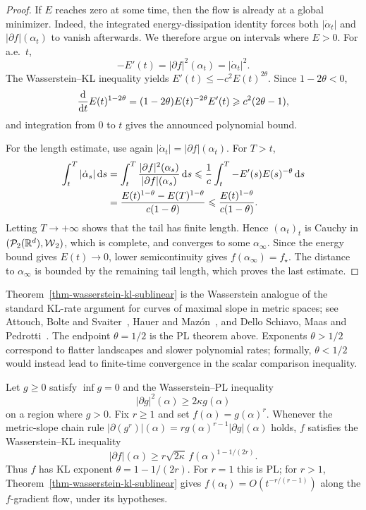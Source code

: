\begin{proof}
	If \(E\) reaches zero at some time, then the flow is already at a global minimizer. Indeed, the integrated energy-dissipation identity forces both \(|\dot\alpha_t|\) and \(|\partial f|(\alpha_t)\) to vanish afterwards. We therefore argue on intervals where \(E>0\). For a.e.\ \(t\),
	\[
		-E'(t)=|\partial f|^2(\alpha_t)=|\dot\alpha_t|^2.
	\]
	The Wasserstein--KL inequality yields
	\(E'(t) \leq -c^2E(t)^{2\theta}\).
	Since \(1-2\theta<0\),
	\[
		\frac{\mathrm{d}}{\mathrm{d} t}E(t)^{1-2\theta}
		=
		(1-2\theta)E(t)^{-2\theta}E'(t)
		\geqslant
		c^2(2\theta-1),
	\]
	and integration from \(0\) to \(t\) gives the announced polynomial bound.

	For the length estimate, use again \(|\dot\alpha_t|=|\partial f|(\alpha_t)\). For \(T>t\),
	\[
		\begin{aligned}
		\int_t^T |\dot\alpha_s|\,\mathrm{d} s
		&=
		\int_t^T \frac{|\partial f|^2(\alpha_s)}{|\partial f|(\alpha_s)}\,\mathrm{d} s
		\leqslant
		\frac1c\int_t^T -E'(s)E(s)^{-\theta}\,\mathrm{d} s \\
		&=
		\frac{E(t)^{1-\theta}-E(T)^{1-\theta}}{c(1-\theta)}
		\leqslant
		\frac{E(t)^{1-\theta}}{c(1-\theta)}.
		\end{aligned}
	\]
	Letting \(T\to+\infty\) shows that the tail has finite length. Hence \((\alpha_t)_t\) is Cauchy in \((\mathcal{P}_2(\mathbb{R}^d),\operatorname{\mathcal{W}}_2)\), which is complete, and converges to some \(\alpha_\infty\). Since the energy bound gives \(E(t)\to0\), lower semicontinuity gives \(f(\alpha_\infty)=f_\star\). The distance to \(\alpha_\infty\) is bounded by the remaining tail length, which proves the last estimate.
\end{proof}

Theorem~\ref{thm-wasserstein-kl-sublinear} is the Wasserstein analogue of the standard KL-rate argument for curves of maximal slope in metric spaces; see Attouch, Bolte and Svaiter~\cite{attouch-2010}, Hauer and Maz{\'o}n~\cite{HauerMazon2019KLSMetric}, and Dello Schiavo, Maas and Pedrotti~\cite{DelloSchiavoMaasPedrotti2023LocalConditions}. The endpoint \(\theta=1/2\) is the PL theorem above. Exponents \(\theta>1/2\) correspond to flatter landscapes and slower polynomial rates; formally, \(\theta<1/2\) would instead lead to finite-time convergence in the scalar comparison inequality.

\begin{prop}\label{prop-powers-pl-are-kl}
	Let \(g\geq0\) satisfy \(\inf g=0\) and the Wasserstein--PL inequality
	\[
		|\partial g|^2(\alpha)
		\geq
		2\kappa g(\alpha)
	\]
	on a region where \(g>0\). Fix \(r\geq1\) and set \(f(\alpha)=g(\alpha)^r\). Whenever the metric-slope chain rule \(|\partial(g^r)|(\alpha)=r g(\alpha)^{r-1}|\partial g|(\alpha)\) holds, \(f\) satisfies the Wasserstein--KL inequality
	\[
		|\partial f|(\alpha)
		\geq
		r\sqrt{2\kappa}\, f(\alpha)^{1-1/(2r)}.
	\]
	Thus \(f\) has KL exponent \(\theta=1-1/(2r)\). For \(r=1\) this is PL; for \(r>1\), Theorem~\ref{thm-wasserstein-kl-sublinear} gives \(f(\alpha_t)=O(t^{-r/(r-1)})\) along the \(f\)-gradient flow, under its hypotheses.
\end{prop}

